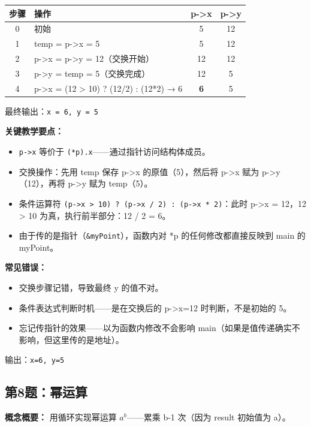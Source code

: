 \begin{center}
\begin{tabular}{c|l|c|c}
\hline
\textbf{步骤} & \textbf{操作} & \textbf{p->x} & \textbf{p->y} \\
\hline
0 & 初始 & 5 & 12 \\
1 & temp = p->x = 5 & 5 & 12 \\
2 & p->x = p->y = 12（交换开始） & 12 & 12 \\
3 & p->y = temp = 5（交换完成） & 12 & 5 \\
4 & p->x = (12 > 10) ? (12/2) : (12*2) → 6 & \textbf{6} & 5 \\
\hline
\end{tabular}
\end{center}

\noindent 最终输出：\texttt{x = 6, y = 5}

\textbf{关键教学要点：}
\begin{itemize}
    \item \texttt{p->x} 等价于 \texttt{(*p).x}——通过指针访问结构体成员。
    \item 交换操作：先用 temp 保存 p->x 的原值（5），然后将 p->x 赋为 p->y（12），再将 p->y 赋为 temp（5）。
    \item 条件运算符 \texttt{(p->x > 10) ? (p->x / 2) : (p->x * 2)}：此时 p->x = 12，12 > 10 为真，执行前半部分：12 / 2 = 6。
    \item 由于传的是指针（\texttt{\&myPoint}），函数内对 *p 的任何修改都直接反映到 main 的 myPoint。
\end{itemize}

\textbf{常见错误：}
\begin{itemize}
    \item 交换步骤记错，导致最终 y 的值不对。
    \item 条件表达式判断时机——是在交换后的 p->x=12 时判断，不是初始的 5。
    \item 忘记传指针的效果——以为函数内修改不会影响 main（如果是值传递确实不影响，但这里传的是地址）。
\end{itemize}

{\color{highlight}输出：\texttt{x=6, y=5}}

\subsection{第8题：幂运算}

\textbf{概念概要：} 用循环实现幂运算 $a^b$——累乘 b-1 次（因为 result 初始值为 a）。

